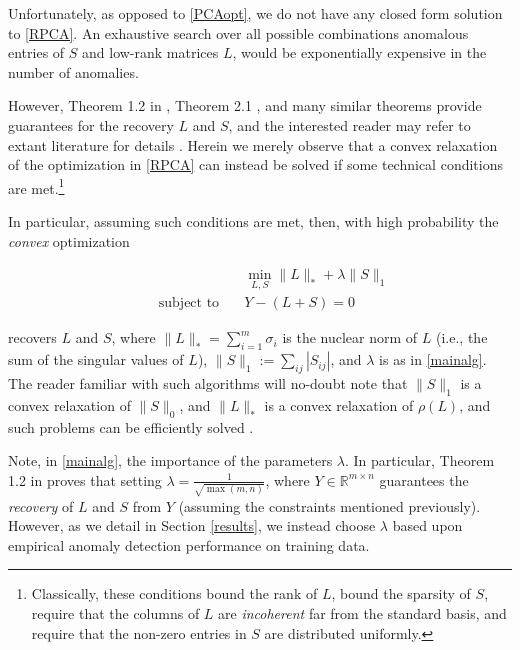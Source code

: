 \documentclass[conference]{IEEEtran}
\begin{document}
Unfortunately, as opposed to
\eqref{PCAopt}, we do not have any closed form solution to
\eqref{RPCA}.   An exhaustive search over all possible
combinations anomalous entries of $S$ and low-rank matrices $L$, 
would be exponentially expensive in the number of anomalies.

However, Theorem 1.2 in \cite{Candes2011}, Theorem 2.1
\cite{Paffenroth2012a}, and many similar theorems provide guarantees for the recovery $L$ and $S$, and the interested reader may refer to extant
literature for details \cite{Candes2009, candes09ex, Chandrasekaran2009,
  Candes2011, Paffenroth2012a, Paffenroth2013b}.
Herein we merely observe that a convex relaxation of the optimization in \eqref{RPCA} can 
instead be solved if some technical conditions are met.\footnote{Classically, these 
conditions bound the
  rank of $L$, bound the sparsity of $S$, require that the columns of
  $L$ are \textit{incoherent} far from the standard basis, and require
  that the non-zero entries in $S$ are distributed uniformly.}

In particular, assuming such conditions are met, then, with high
probability the \emph{convex} optimization 

\begin{align} \label{mainalg}
  &\min_{L,S}\|L\|_{*}+\lambda\|S\|_{1}\\ \nonumber
  \qquad \text{subject to} \quad &
                                   Y-(L+S)=0
\end{align}

\noindent recovers $L$ and $S$, where
$\|L\|_{*} = \sum_{i=1}^m\sigma_{i}$ is the nuclear norm of $L$ (i.e.,
the sum of the singular values of $L$),
$\|S\|_1:= \sum_{ij}|S_{ij}|$, and $\lambda$ is as in \eqref{mainalg}.  The reader familiar
with such algorithms will no-doubt note that $\|S\|_1$ is a convex
relaxation of $\|S\|_0$, and $\|L\|_*$ is a convex relaxation of
$\rho(L)$, and such problems can be efficiently solved
\cite{Boyd2010a, Candes2009, Candes2011, Paffenroth2012a,
  Paffenroth2013b, Halko2011}.

Note, in \eqref{mainalg}, the importance of the parameters $\lambda$.  
In particular, Theorem 1.2 in \cite{Candes2011}
proves that setting $\lambda = \frac{1}{\sqrt{\max(m,n)}}$, where
$Y \in \mathbb{R}^{m \times n}$ guarantees the \emph{recovery} of $L$
and $S$ from $Y$ (assuming the constraints mentioned previously).  However, as we detail in Section \ref{results}, we instead choose $\lambda$ based upon empirical anomaly detection performance on training data.
\end{document}
